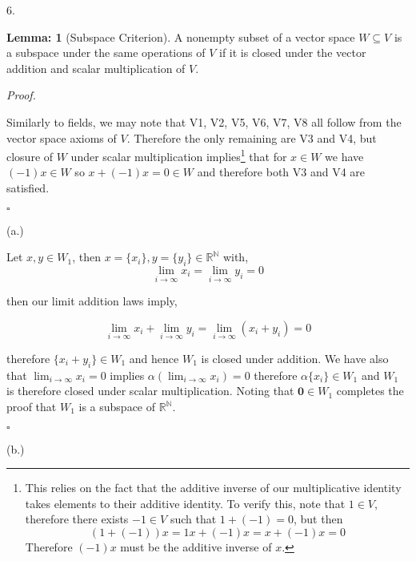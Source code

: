 \documentclass[letterpaper,11pt]{article}
\theoremstyle{definition}
\newtheorem*{lemma}{Lemma:}
\begin{document}
\pagebreak
\begin{flushleft}
	6.
\end{flushleft}

\begin{lemma}[Subspace Criterion]
	A nonempty subset of a vector space $W \subseteq V$ is a subspace under the same operations of $V$ if it is closed under the vector addition and scalar multiplication of $V$.
\end{lemma}

\textit{Proof.}

Similarly to fields, we may note that V1, V2, V5, V6, V7, V8 all follow from the vector space axioms of $V$. Therefore the only remaining are V3 and V4, but closure of $W$ under scalar multiplication implies\footnote{This relies on the fact that the additive inverse of our multiplicative identity takes elements to their additive identity. To verify this, note that $1 \in V$, therefore there exists $-1 \in V$ such that $1 + (-1) = 0$, but then $$(1+ (-1))x = 1x + (-1)x = x + (-1)x = 0$$ Therefore $(-1)x$ must be the additive inverse of $x$.} that for $x \in W$ we have $(-1)x \in W$ so $x + (-1)x = 0 \in W$ and therefore both V3 and V4 are satisfied. 


\begin{flushright}
	$\square$
\end{flushright}


\begin{flushleft}
	(a.)
\end{flushleft}

Let $x, y \in W_1$, then $x = \{x_i\}, y = \{y_i\} \in \mathbb{R}^\mathbb{N}$ with, $$\lim_{i \to \infty} x_i = \lim_{i \to \infty} y_i = 0$$ 

then our limit addition laws imply, 

$$\lim_{i \to \infty} x_i + \lim_{i \to \infty} y_i = \lim_{i \to \infty} (x_i +  y_i) = 0$$
 
therefore $\{x_i + y_i\} \in W_1$ and hence $W_1$ is closed under addition. We have also that $\lim_{i \to \infty} x_i = 0$ implies $\alpha(\lim_{i \to \infty}x_i) = 0$ therefore $\alpha \{x_i\}  \in W_1$ and $W_1$ is therefore closed under scalar multiplication. Noting that $\textbf{0} \in W_1$ completes the proof that $W_1$ is a subspace of $\mathbb{R}^\mathbb{N}$. 

\begin{flushright}
	$\square$
\end{flushright}

\begin{flushleft}
	(b.)
\end{flushleft}
\end{document}

